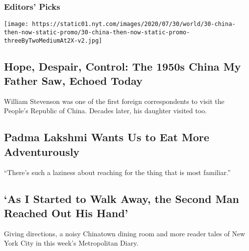 \hypertarget{editors-picks}{%
\subsubsection{Editors' Picks}\label{editors-picks}}

\href{/interactive/2020/07/30/world/asia/china-1950s-echoed-today.html}{}

\texttt{[image: https://static01.nyt.com/images/2020/07/30/world/30-china-then-now-static-promo/30-china-then-now-static-promo-threeByTwoMediumAt2X-v2.jpg]}

\href{/interactive/2020/07/30/world/asia/china-1950s-echoed-today.html}{}

\hypertarget{hope-despair-control-the-1950s-china-my-father-saw-echoed-today}{%
\subsection{Hope, Despair, Control: The 1950s China My Father Saw,
Echoed
Today}\label{hope-despair-control-the-1950s-china-my-father-saw-echoed-today}}

William Stevenson was one of the first foreign correspondents to visit
the People's Republic of China. Decades later, his daughter visited too.

\href{/interactive/2020/08/03/magazine/padma-lakshmi-interview.html}{}

\hypertarget{padma-lakshmi-wants-us-to-eat-more-adventurously}{%
\subsection{Padma Lakshmi Wants Us to Eat More
Adventurously}\label{padma-lakshmi-wants-us-to-eat-more-adventurously}}

``There's such a laziness about reaching for the thing that is most
familiar.''

\href{/interactive/2020/08/03/magazine/padma-lakshmi-interview.html}{}

\href{/2020/08/02/nyregion/metropolitan-diary.html}{}

\hypertarget{as-i-started-to-walk-away-the-second-man-reached-out-his-hand}{%
\subsection{`As I Started to Walk Away, the Second Man Reached Out His
Hand'}\label{as-i-started-to-walk-away-the-second-man-reached-out-his-hand}}

Giving directions, a noisy Chinatown dining room and more reader tales
of New York City in this week's Metropolitan Diary.

